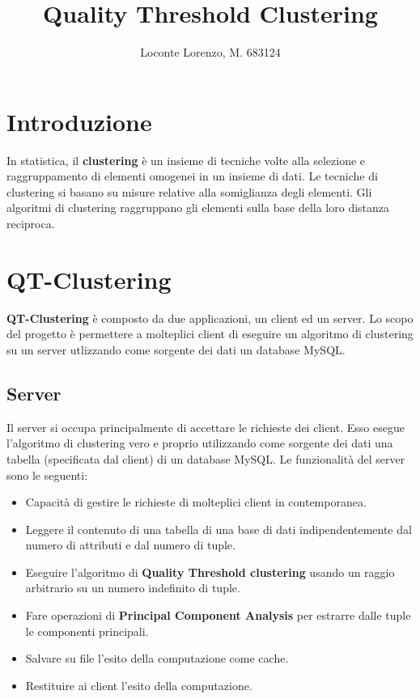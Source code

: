\documentclass{article}
\title{Quality Threshold Clustering}
\author{Loconte Lorenzo, M. 683124}
\begin{document}
	\maketitle
	\section{Introduzione}
	In statistica, il \textbf{clustering} è un insieme di tecniche volte
	alla selezione e raggruppamento di elementi omogenei in un insieme di
	dati. Le tecniche di clustering si basano su misure relative alla
	somiglianza degli elementi. Gli algoritmi di clustering raggruppano gli
	elementi sulla base della loro distanza reciproca.

	\section{QT-Clustering}
	\textbf{QT-Clustering} è composto da due applicazioni, un client ed un
	server. Lo scopo del progetto è permettere a molteplici client di
	eseguire un algoritmo di clustering su un server utlizzando come
	sorgente dei dati un database MySQL.

	\subsection{Server}
	Il server si occupa principalmente di accettare le richieste dei client.
	Esso esegue l'algoritmo di clustering vero e proprio utilizzando come
	sorgente dei dati una tabella (specificata dal client) di un database
	MySQL. Le funzionalità del server sono le seguenti:
	\begin{itemize}
		\item Capacità di gestire le richieste di molteplici client in
		contemporanea.
		\item Leggere il contenuto di una tabella di una base di dati
		indipendentemente dal numero di attributi e dal numero di tuple.
		\item Eseguire l'algoritmo di \textbf{Quality Threshold
		clustering} usando un raggio arbitrario su un numero indefinito
		di tuple.
		\item Fare operazioni di \textbf{Principal Component Analysis}
		per estrarre dalle tuple le componenti principali.
		\item Salvare su file l'esito della computazione come cache.
		\item Restituire ai client l'esito della computazione.
	\end{itemize}
\end{document}
